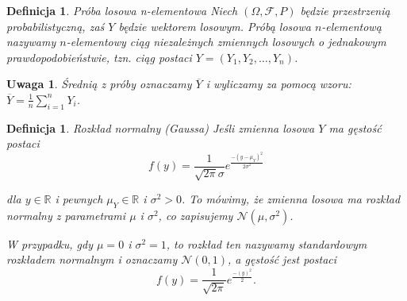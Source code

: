 \documentclass[12pt,a4paper]{report}
\newtheorem{definition}[theorem]{Definicja}
\newtheorem{uwaga}{Uwaga}
\begin{document}
\begin{definition}{Próba losowa n-elementowa \cite[Rozdział 2]{bartoszewicz1996}}
Niech $(\Omega, \mathcal{F}, P)$ będzie przestrzenią probabilistyczną, zaś $Y$ będzie wektorem losowym.  
Próbą losowa $n$-elementową nazywamy $n$-elementowy ciąg niezależnych zmiennych losowych o jednakowym prawdopodobieństwie, tzn. ciąg postaci $Y=(Y_1, Y_2, \ldots, Y_n)$.
\end{definition}

\begin{uwaga}
Średnią z próby oznaczamy $\overline{Y}$ i wyliczamy za pomocą wzoru: $\overline{Y}=\frac{1}{n}\sum\limits_{i=1}^{n}{Y_{i}}$.
\end{uwaga}

\begin{definition}{Rozkład normalny (Gaussa) \cite[Rozdział 5.10]{jakubowski2004}}
Jeśli zmienna losowa $Y$ ma gęstość postaci
$$
f(y)=\frac{1}{\sqrt{2\pi}\sigma}e^\frac{-(y-\mu_Y)^2}{2\sigma^2}
$$ 

dla $y \in \mathbb{R}$ i pewnych $\mu_Y \in \mathbb{R}$ i $\sigma^2 >0$. To mówimy, że zmienna losowa ma rozkład normalny z parametrami $\mu$ i $\sigma^2$, co zapisujemy $\mathcal{N}(\mu, \sigma^2)$.


W przypadku, gdy $\mu=0$ i $\sigma^2=1$, to rozkład ten nazywamy standardowym rozkładem normalnym i oznaczamy $\mathcal{N}(0,1)$, a gęstość jest postaci
$$f(y)=\frac{1}{\sqrt{2\pi}}e^\frac{-(y)^2}{2}.$$ 
\end{definition}


\end{document}
